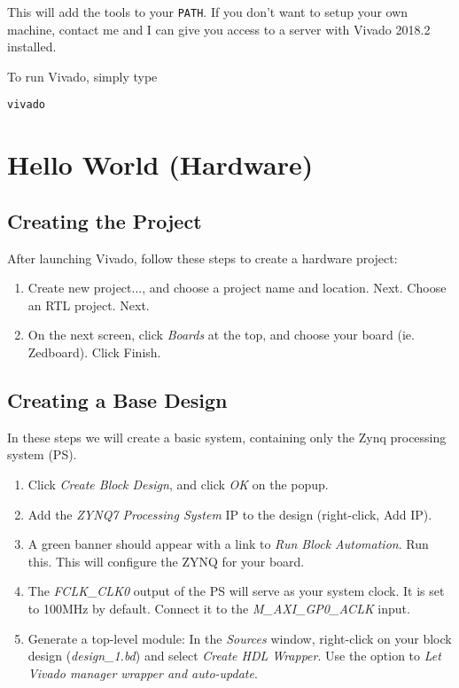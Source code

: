 This will add the tools to your {\tt PATH}.  If you don't want to setup your own machine, contact me and I can give you access to a server with Vivado 2018.2 installed.

To run Vivado, simply type
\begin{lstlisting}
vivado
\end{lstlisting}


\section{Hello World (Hardware)}
\subsection{Creating the Project}
After launching Vivado, follow these steps to create a hardware project:
\begin{enumerate}
\item Create new project..., and choose a project name and location.  Next.  Choose an RTL project. Next.  
\item On the next screen, click \emph{Boards} at the top, and choose your board (ie. Zedboard).  Click Finish.
\end{enumerate}

\subsection{Creating a Base Design}
In these steps we will create a basic system, containing only the Zynq processing system (PS).
\begin{enumerate}
	\item Click \emph{Create Block Design}, and click \emph{OK} on the popup.
	\item Add the \emph{ZYNQ7 Processing System} IP to the design (right-click, Add IP).
	\item A green banner should appear with a link to \emph{Run Block Automation}.  Run this. This will configure the ZYNQ for your board.
	\item The \emph{FCLK\_CLK0} output of the PS will serve as your system clock.  It is set to 100MHz by default.  Connect it to the \emph{M\_AXI\_GP0\_ACLK} input.	
	\item Generate a top-level module: In the \emph{Sources} window, right-click on your block design (\emph{design\_1.bd}) and select \emph{Create HDL Wrapper}. Use the option to \emph{Let Vivado manager wrapper and auto-update}.
\end{enumerate}

